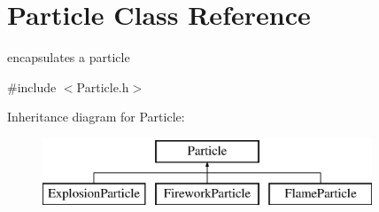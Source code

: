 \hypertarget{classParticle}{\section{Particle Class Reference}
\label{classParticle}
}


encapsulates a particle  




{\ttfamily \#include $<$Particle.\-h$>$}

Inheritance diagram for Particle\-:\begin{figure}[H]
\begin{center}
\leavevmode
\includegraphics[height=2.000000cm]{classParticle}
\end{center}
\end{figure}
